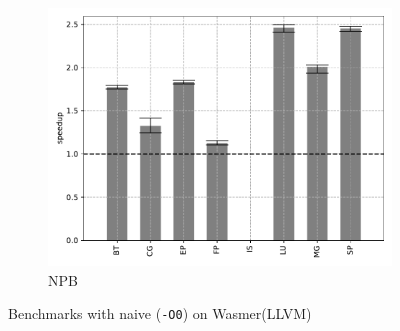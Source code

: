 \begin{figure}
\begin{subfigure}[t]{.45\textwidth}
        \includegraphics[width=\textwidth]
        {Images/6.1.RQ1/npb-wasmer-llvm-naive.pdf}
        \caption{NPB}
    \end{subfigure}
    \caption{Benchmarks with naive (\texttt{-O0}) on Wasmer(LLVM)}
    \label{fig:rq1-wasmer-llvm-naive}
\end{figure}

